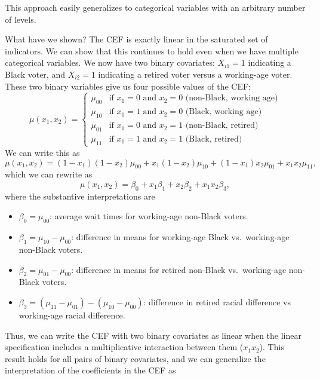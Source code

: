\documentclass[
  13pt,
  letterpaper,
  DIV=11,
  numbers=noendperiod]{scrreprt}
\providecommand{\tightlist}{%
  \setlength{\itemsep}{0pt}\setlength{\parskip}{0pt}}
\theoremstyle{plain}
\theoremstyle{plain}
\theoremstyle{definition}
\theoremstyle{definition}
\theoremstyle{remark}
\begin{document}
This approach easily generalizes to categorical variables with an
arbitrary number of levels.

What have we shown? The CEF is exactly linear in the saturated set of
indicators. We can show that this continues to hold even when we have
multiple categorical variables. We now have two binary covariates:
\(X_{i1}=1\) indicating a Black voter, and \(X_{i2} = 1\) indicating a
retired voter versus a working-age voter. These two binary variables
give us four possible values of the CEF: \[ 
\mu(x_1, x_2) = \begin{cases} 
 \mu_{00} & \text{if } x_1 = 0 \text{ and } x_2 = 0 \text{ (non-Black, working age)} \\
 \mu_{10} & \text{if } x_1 = 1 \text{ and } x_2 = 0 \text{ (Black, working age)} \\
 \mu_{01} & \text{if } x_1 = 0 \text{ and } x_2 = 1 \text{ (non-Black, retired)} \\
 \mu_{11} & \text{if } x_1 = 1 \text{ and } x_2 = 1 \text{ (Black, retired)}
 \end{cases}
\] We can write this as \[ 
\mu(x_{1}, x_{2}) = (1 - x_{1})(1 - x_{2})\mu_{00} + x_{1}(1 -x_{2})\mu_{10} + (1-x_{1})x_{2}\mu_{01} + x_{1}x_{2}\mu_{11},
\] which we can rewrite as \[ 
\mu(x_1, x_2) = \beta_0 + x_1\beta_1 + x_2\beta_2 + x_1x_2\beta_3,
\] where the substantive interpretations are

\begin{itemize}
\tightlist
\item
  \(\beta_0 = \mu_{00}\): average wait times for working-age non-Black
  voters.
\item
  \(\beta_1 = \mu_{10} - \mu_{00}\): difference in means for working-age
  Black vs.~working-age non-Black voters.
\item
  \(\beta_2 = \mu_{01} - \mu_{00}\): difference in means for retired
  non-Black vs.~working-age non-Black voters.
\item
  \(\beta_3 = (\mu_{11} - \mu_{01}) - (\mu_{10} - \mu_{00})\):
  difference in retired racial difference vs working-age racial
  difference.
\end{itemize}

Thus, we can write the CEF with two binary covariates as linear when the
linear specification includes a multiplicative interaction between them
(\(x_1x_2\)). This result holds for all pairs of binary covariates, and
we can generalize the interpretation of the coefficients in the CEF as
\end{document}
